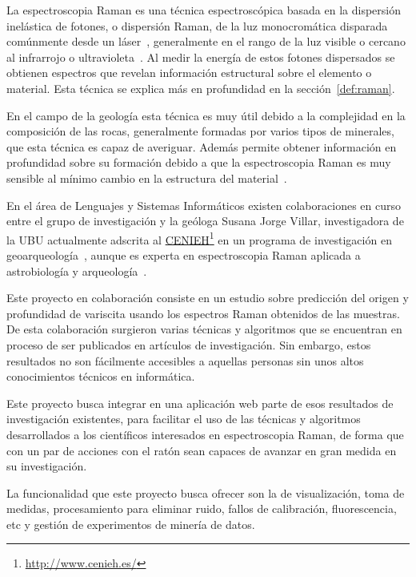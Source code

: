 \label{ch:introduccion}

La espectroscopia Raman es una técnica espectroscópica basada en la dispersión
inelástica de fotones, o dispersión Raman, de la luz monocromática disparada
comúnmente desde un láser~\cite{raman-basics}, generalmente en el rango de la 
luz visible o cercano al infrarrojo o ultravioleta~\cite{wiki:raman-en}. Al 
medir la energía de estos fotones dispersados se obtienen espectros que revelan
información estructural sobre el elemento o material. Esta técnica se explica
más en profundidad en la sección~\ref{def:raman}.

En el campo de la geología esta técnica es muy útil debido a la complejidad en
la composición de las rocas, generalmente formadas por varios tipos de
minerales, que esta técnica es capaz de averiguar. Además permite obtener
información en profundidad sobre su formación debido a que la espectroscopia 
Raman es muy sensible al mínimo cambio en la estructura del 
material~\cite{quora:raman-geology}.

En el área de Lenguajes y Sistemas Informáticos existen colaboraciones en curso
entre el grupo de investigación
 y la geóloga Susana Jorge
Villar, investigadora de la UBU actualmente adscrita al
\href{http://www.cenieh.es/}{CENIEH}\footnote{\url{http://www.cenieh.es/}} en un
programa de investigación en geoarqueología~\cite{susana-cenieh}, aunque es
experta en espectroscopia Raman aplicada a astrobiología y
arqueología~\cite{susana-ubu}.

Este proyecto en colaboración consiste en un estudio sobre predicción del origen
y profundidad de variscita usando los espectros Raman obtenidos de las muestras.
De esta colaboración surgieron varias técnicas y algoritmos que se encuentran en
proceso de ser publicados en artículos de investigación. Sin embargo, estos
resultados no son fácilmente accesibles a aquellas personas sin unos altos
conocimientos técnicos en informática.

Este proyecto busca integrar en una aplicación web parte de esos resultados de
investigación existentes, para facilitar el uso de las técnicas y algoritmos
desarrollados a los científicos interesados en espectroscopia Raman, de forma
que con un par de acciones con el ratón sean capaces de avanzar en gran medida
en su investigación.

La funcionalidad que este proyecto busca ofrecer son la de visualización, toma
de medidas, procesamiento para eliminar ruido, fallos de calibración,
fluorescencia, etc y gestión de experimentos de minería de datos.

